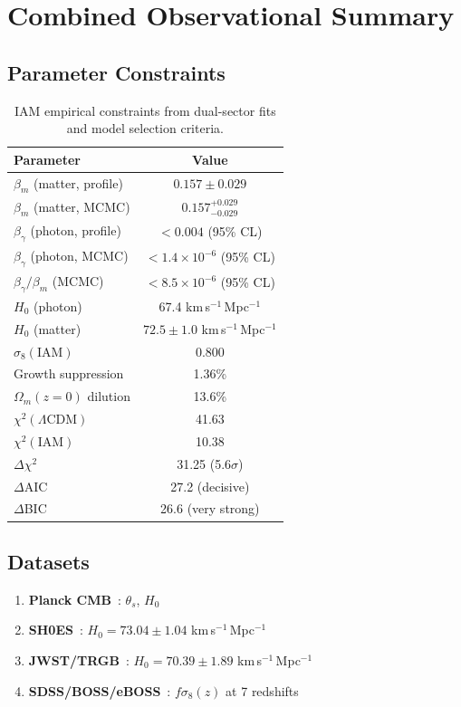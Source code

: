 \documentclass[twocolumn,superscriptaddress,prl,amsmath,amssymb]{revtex4-2}
\begin{document}
\section{Combined Observational Summary}

\subsection{Parameter Constraints}

\begin{table}[h]
\centering
\begin{tabular}{lc}
\hline\hline
Parameter & Value \\
\hline
$\beta_m$ (matter, profile) & $0.157 \pm 0.029$ \\
$\beta_m$ (matter, MCMC) & $0.157^{+0.029}_{-0.029}$ \\
$\beta_\gamma$ (photon, profile) & $< 0.004$ (95\% CL) \\
$\beta_\gamma$ (photon, MCMC) & $< 1.4 \times 10^{-6}$ (95\% CL) \\
$\beta_\gamma/\beta_m$ (MCMC) & $< 8.5 \times 10^{-6}$ (95\% CL) \\
\hline
$H_0$ (photon) & 67.4 km\,s$^{-1}$\,Mpc$^{-1}$ \\
$H_0$ (matter) & $72.5 \pm 1.0$ km\,s$^{-1}$\,Mpc$^{-1}$ \\
\hline
$\sigma_8(\text{IAM})$ & 0.800 \\
Growth suppression & 1.36\% \\
$\Omega_m(z=0)$ dilution & 13.6\% \\
\hline
$\chi^2(\Lambda\text{CDM})$ & 41.63 \\
$\chi^2(\text{IAM})$ & 10.38 \\
$\Delta\chi^2$ & 31.25 (5.6$\sigma$) \\
\hline
$\Delta$AIC & 27.2 (decisive) \\
$\Delta$BIC & 26.6 (very strong) \\
\hline\hline
\end{tabular}
\caption{IAM empirical constraints from dual-sector fits and model selection criteria.}
\label{tab:results}
\end{table}

\subsection{Datasets}

\begin{enumerate}
\item \textbf{Planck CMB}~\cite{PlanckCollaboration2020}: $\theta_s$, $H_0$
\item \textbf{SH0ES}~\cite{Riess2022}: $H_0 = 73.04 \pm 1.04$ km\,s$^{-1}$\,Mpc$^{-1}$
\item \textbf{JWST/TRGB}~\cite{Freedman2024}: $H_0 = 70.39 \pm 1.89$ km\,s$^{-1}$\,Mpc$^{-1}$
\item \textbf{SDSS/BOSS/eBOSS}~\cite{Alam2021}: $f\sigma_8(z)$ at 7 redshifts
\end{enumerate}
\end{document}

